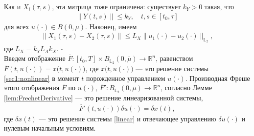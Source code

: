 \documentclass[../main.tex]{subfiles}
\begin{document}
		Как и $X_i(\tau,s)$, эта матрица тоже ограничена: существует $k_Y>0$ такая, что
		\begin{gather*}
			\|Y(t,s)\| \leqslant k_Y, \quad t,s \in [t_0, \tau]
		\end{gather*}
		для всех $u(\cdot) \in B(0,\mu)$. Наконец, имеем 
		\begin{gather*}
			\| X_1(\tau,s) - X_2(\tau,s) \| \leqslant L_X \| u_1(\cdot) - u_2(\cdot) \|_{\mathbb{L}_2}, 
		\end{gather*} 
	где $ L_X = k_Y L_A k_X$. \hfill$\square$\\[1ex]%
	Введем отображение $\overline{F}: [t_0,T]  \times B_{\mathbb{L}_2}(0,\overline{\mu}) \to \mathbb{R}^n$, равенством $\overline{F}(t, u(\cdot)) = x \big(t, u(\cdot)\big) $, где $x \big(t, u(\cdot)\big)$ --- это решение системы \eqref{sec1:nonlinear} в момент $t$ порожденное управлением $u(\cdot)$.  Производная Фреше этого отображения $\overline{F}$ по $u(\cdot)$, $\overline{F}': B_{\mathbb{L}_2}(0,\overline{\mu}) \to \mathbb{R}^n $, согласно Лемме \ref{lem:FrechetDerivative} --- это решение линеаризованной системы, 
	\begin{gather}\label{dF}
		\overline{F}'(t, u(\cdot)) \delta u(\cdot) = \delta x(t), 
	\end{gather}
	где $\delta x(t)$ --- это решение системы \eqref{linear} и отвечающее управлению $\delta u(\cdot)$ и нулевым начальным условиям.
	
\end{document}
